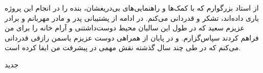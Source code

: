 


\begin{center}
\end{center}

از استاد بزرگوارم که با کمک‌ها و راهنمایی‌های بی‌دریغشان، بنده را در انجام این پروژه یاری داده‌اند، تشکر و قدردانی می‌کنم.
در ادامه از پشتیبانی پدر و مادر مهربانم و برادر عزیزم سعید که در طول این سالیان محیط دوست‌داشتنی و آرام خانه را برای من فراهم کردند سپاس‌گزارم. و در پایان از همراهی دوست عزیزم یاسمن رازقی قدردانی می‌کنم که در طی چند سال گذشته نقش مهمی در پیشرفت من ایفا کرده است.

‌جدید
